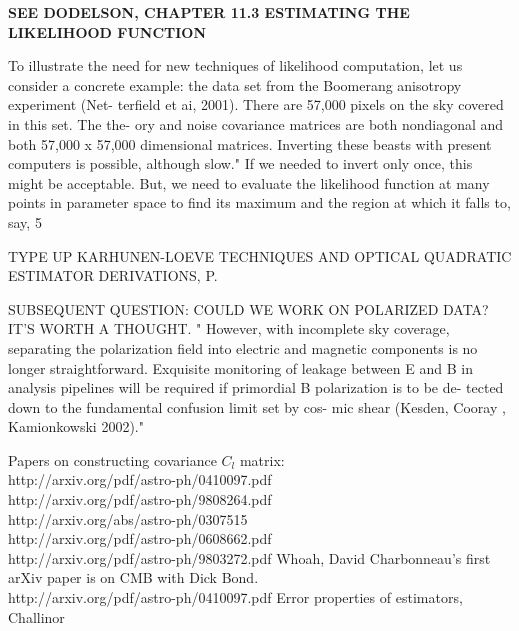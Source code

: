 \documentclass[a4paper, 11pt]{article}
\begin{document}
\textbf{SEE DODELSON, CHAPTER 11.3 ESTIMATING THE LIKELIHOOD FUNCTION}



To illustrate the need for new techniques of likelihood computation, let us consider a concrete example: the data set from the Boomerang anisotropy experiment (Net- terfield et ai, 2001). There are 57,000 pixels on the sky covered in this set. The the- ory and noise covariance matrices are both nondiagonal and both 57,000 x 57,000 dimensional matrices. Inverting these beasts with present computers is possible, although slow." If we needed to invert only once, this might be acceptable. But, we need to evaluate the likelihood function at many points in parameter space to find its maximum and the region at which it falls to, say, 5%

TYPE UP KARHUNEN-LOEVE TECHNIQUES AND OPTICAL QUADRATIC ESTIMATOR DERIVATIONS, P. 




SUBSEQUENT QUESTION: COULD WE WORK ON POLARIZED DATA? IT'S WORTH A THOUGHT. " However, with incomplete sky coverage, separating the polarization field into electric and magnetic components is no longer straightforward. Exquisite monitoring of leakage between E and B in analysis pipelines will be required if primordial B polarization is to be de- tected down to the fundamental confusion limit set by cos- mic shear (Kesden, Cooray , Kamionkowski 2002)."


Papers on constructing covariance $C_l$ matrix: \\
http://arxiv.org/pdf/astro-ph/0410097.pdf \\
http://arxiv.org/pdf/astro-ph/9808264.pdf \\
http://arxiv.org/abs/astro-ph/0307515 \\
http://arxiv.org/pdf/astro-ph/0608662.pdf \\
http://arxiv.org/pdf/astro-ph/9803272.pdf Whoah, David Charbonneau's first arXiv paper is on CMB with Dick Bond. \\
http://arxiv.org/pdf/astro-ph/0410097.pdf Error properties of estimators, Challinor
\end{document}
